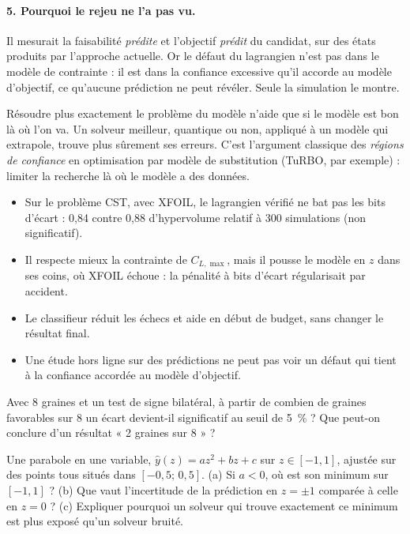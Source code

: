 \paragraph{5. Pourquoi le rejeu ne l'a pas vu.} Il mesurait la faisabilité \emph{prédite} et l'objectif \emph{prédit} du candidat, sur des états produits par l'approche actuelle. Or le défaut du lagrangien n'est pas dans le modèle de contrainte : il est dans la confiance excessive qu'il accorde au modèle d'objectif, ce qu'aucune prédiction ne peut révéler. Seule la simulation le montre.

\begin{piege}
Résoudre plus exactement le problème du modèle n'aide que si le modèle est bon là où l'on va. Un solveur meilleur, quantique ou non, appliqué à un modèle qui extrapole, trouve plus sûrement ses erreurs. C'est l'argument classique des \emph{régions de confiance} en optimisation par modèle de substitution (TuRBO, par exemple) : limiter la recherche là où le modèle a des données.
\end{piege}

\begin{resultat}
\begin{itemize}
\item Sur le problème CST, avec XFOIL, le lagrangien vérifié ne bat pas les bits d'écart : 0,84 contre 0,88 d'hypervolume relatif à 300 simulations (non significatif).
\item Il respecte mieux la contrainte de $C_{L,\max}$, mais il pousse le modèle en $z$ dans ses coins, où XFOIL échoue : la pénalité à bits d'écart régularisait par accident.
\item Le classifieur réduit les échecs et aide en début de budget, sans changer le résultat final.
\item Une étude hors ligne sur des prédictions ne peut pas voir un défaut qui tient à la confiance accordée au modèle d'objectif.
\end{itemize}
\end{resultat}

\exercices
\begin{exercice}\label{ex:camp-signe}
Avec 8 graines et un test de signe bilatéral, à partir de combien de graines favorables sur 8 un écart devient-il significatif au seuil de 5~\% ? Que peut-on conclure d'un résultat « 2 graines sur 8 » ?
\end{exercice}
\begin{exercice}\label{ex:camp-coins}
Une parabole en une variable, $\hat y(z)=a z^2+bz+c$ sur $z\in[-1,1]$, ajustée sur des points tous situés dans $[-0{,}5;\,0{,}5]$. (a) Si $a<0$, où est son minimum sur $[-1,1]$ ? (b) Que vaut l'incertitude de la prédiction en $z=\pm1$ comparée à celle en $z=0$ ? (c) Expliquer pourquoi un solveur qui trouve exactement ce minimum est plus exposé qu'un solveur bruité.
\end{exercice}

